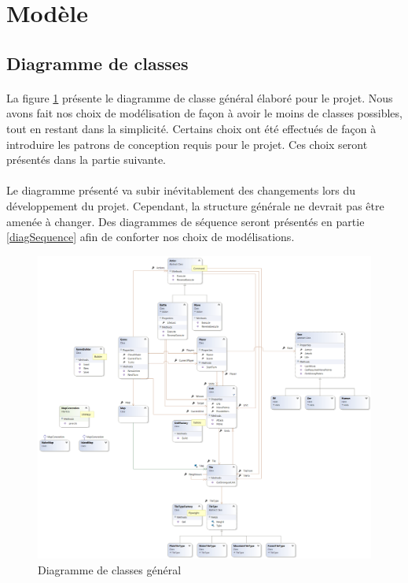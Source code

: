 \section{Modèle}

\subsection{Diagramme de classes}

\paragraph{}
La figure \ref{fig:class} présente le diagramme de classe général élaboré pour le projet.
Nous avons fait nos choix de modélisation de façon à avoir le moins de classes possibles, tout en restant dans la simplicité.
Certains choix ont été effectués de façon à introduire les patrons de conception requis pour le projet. Ces choix seront présentés dans la partie suivante.

\paragraph{}
Le diagramme présenté va subir inévitablement des changements lors du développement du projet. Cependant, la structure générale ne devrait pas être amenée à changer. Des diagrammes de séquence seront présentés en partie \ref{diagSequence} afin de conforter nos choix de modélisations.

\begin{figure}[h]
  \centering
  \includegraphics[width=13cm]{schemas/ClassDiagram.png}
  \caption{Diagramme de classes général}
  \label{fig:class}
\end{figure}

